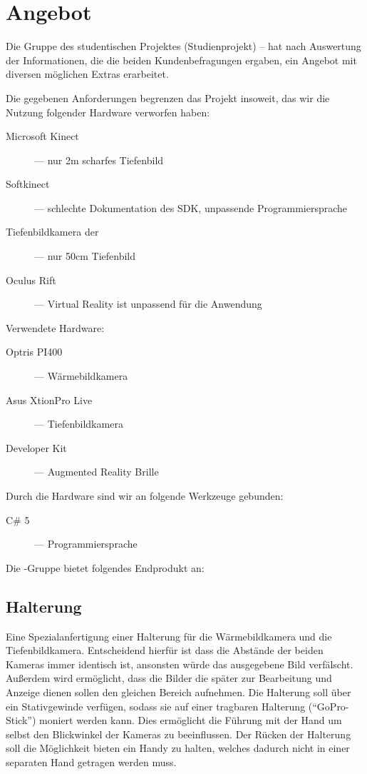 
\chapter{Angebot}
\label{chap:angebot}

Die Gruppe des studentischen Projektes (Studienprojekt) – \profire hat nach Auswertung der Informationen, die die beiden Kundenbefragungen ergaben, ein Angebot mit diversen möglichen Extras erarbeitet.

Die gegebenen Anforderungen begrenzen das Projekt insoweit, das wir die Nutzung folgender Hardware verworfen haben:
\begin{description}
	\item [Microsoft Kinect] --- nur 2m scharfes Tiefenbild
	\item [Softkinect] --- schlechte Dokumentation des SDK, unpassende Programmiersprache
	\item [Tiefenbildkamera der \meta] --- nur 50cm Tiefenbild
	\item [Oculus Rift] --- Virtual Reality ist unpassend für die Anwendung
\end{description}
\bigbreak

Verwendete Hardware:
\begin{description}
	\item [Optris  PI400] --- Wärmebildkamera
	\item [Asus XtionPro Live] --- Tiefenbildkamera
	\item [\meta Developer Kit] --- Augmented Reality Brille
\end{description}
\bigbreak

Durch die Hardware sind wir an folgende Werkzeuge gebunden:
\begin{description}
	\item [C\# 5] --- Programmiersprache
\end{description}
\bigbreak

Die \profire-Gruppe bietet folgendes Endprodukt an:

\section{Halterung}
Eine Spezialanfertigung einer Halterung für die Wärmebildkamera und die Tiefenbildkamera.
Entscheidend hierfür ist dass die Abstände der beiden Kameras immer identisch ist, ansonsten würde das ausgegebene Bild verfälscht.
Außerdem wird ermöglicht, dass die Bilder die später zur Bearbeitung und Anzeige dienen sollen den gleichen Bereich aufnehmen.
Die Halterung soll  über ein Stativgewinde verfügen, sodass sie auf einer tragbaren Halterung (\zB \enquote{GoPro-Stick}) moniert werden kann.
Dies ermöglicht die Führung mit der Hand um selbst den Blickwinkel der Kameras zu beeinflussen.
Der Rücken der Halterung soll die Möglichkeit bieten ein Handy zu halten, welches dadurch nicht in einer separaten Hand getragen werden muss.


